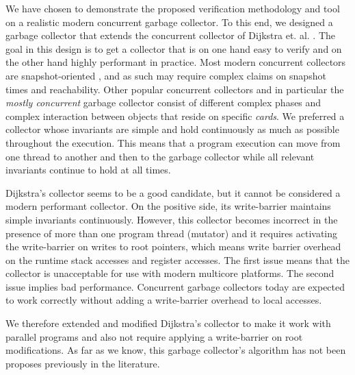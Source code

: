 We have chosen to demonstrate the proposed verification methodology and tool on a realistic modern concurrent garbage collector. To this end, we designed a garbage collector that extends the concurrent collector of Dijkstra et. al. \cite{dijk78}. The goal in this design is to get a collector that is on one hand easy to verify and on the other hand highly performant in practice. Most modern concurrent collectors are snapshot-oriented  \cite{doli93,doli94,doma00,azat03}, and as such may require complex claims on snapshot times and reachability. Other popular concurrent collectors and in particular the {\em mostly concurrent} garbage collector \cite{boeh91,prin00a,bara05} consist of different complex phases and complex interaction between objects that reside on specific {\em cards}. We preferred a collector whose invariants are simple and hold continuously as much as possible throughout the execution. This means that a program execution can move from one thread to another and then to the garbage collector while all relevant invariants continue to hold at all times. 

Dijkstra's collector seems to be a good candidate, but it cannot be considered a modern performant collector. On the positive side, its write-barrier maintains simple invariants continuously. However, this collector becomes incorrect in the presence of more than one program thread (mutator) and it requires activating the write-barrier on writes to root pointers, which means write barrier overhead on the runtime stack accesses and register accesses. The first issue means that the collector is unacceptable for use with modern multicore platforms. The second issue implies bad performance. Concurrent garbage collectors today are expected to work correctly without adding a write-barrier overhead to local accesses. 

We therefore extended and modified Dijkstra's collector to make it work with parallel programs and also not require applying a write-barrier on root modifications. As far as we know, this garbage collector's algorithm has not been proposes previously in the literature.  



